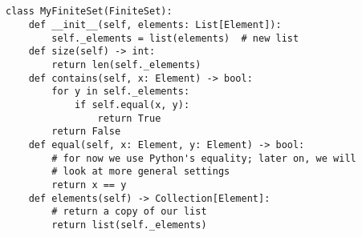 \begin{minipage}{488pt}
\begin{verbatim}


class MyFiniteSet(FiniteSet):
    def __init__(self, elements: List[Element]):
        self._elements = list(elements)  # new list
    def size(self) -> int:
        return len(self._elements)
    def contains(self, x: Element) -> bool:
        for y in self._elements:
            if self.equal(x, y):
                return True
        return False
    def equal(self, x: Element, y: Element) -> bool:
        # for now we use Python's equality; later on, we will
        # look at more general settings
        return x == y
    def elements(self) -> Collection[Element]:
        # return a copy of our list
        return list(self._elements)
\end{verbatim}
\end{minipage}